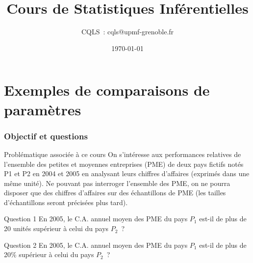 \documentclass[11pt]{beamer}
\title[Problématiques Produits A et B]
{Cours de Statistiques Inférentielles}
\author{CQLS~: cqls@upmf-grenoble.fr}
\date{\today}
\begin{document}
\maketitle



\section{Exemples de comparaisons de paramètres}
\begin{frame}
\frametitle{Objectif et questions}

\begin{exampleblock}{Problématique associée à ce cours}
On s'intéresse aux performances relatives de l'ensemble des petites et moyennes entreprises (PME) de deux pays fictifs notés P1 et P2 en 2004 et 2005 en analysant leurs chiffres d'affaires (exprimés dans une même unité). Ne pouvant pas interroger l'ensemble des PME, on ne pourra disposer que des chiffres d'affaires sur des échantillons de PME (les tailles d'échantillons seront précisées plus tard).
\end{exampleblock}


\begin{block}{Question 1}
En 2005, le C.A. annuel moyen des PME du pays $P_1$ est-il de plus de 20 unités supérieur à celui du pays $P_2$~?
\end{block}

\begin{block}{Question 2}
En 2005, le C.A. annuel moyen des PME du pays $P_1$ est-il de plus de 20\% supérieur à celui du pays $P_2$~?
\end{block}

\end{frame}
\end{document}
